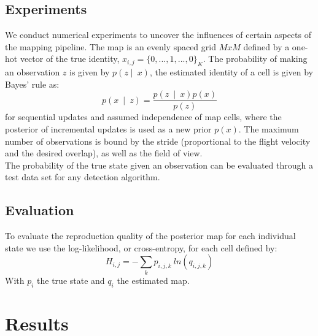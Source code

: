 \documentclass[twocolumn,letterpaper]{IEEEAerospaceCLS}  %
\begin{document}
\subsection{Experiments}
We conduct numerical experiments to uncover the influences of certain aspects of the mapping pipeline. The map is an evenly spaced grid $MxM$ defined by a one-hot vector of the true identity, $x_{i,j} = \{0,..., 1, ..., 0\}_K$. The probability of making an observation $z$ is given by $p(z\mid~x)$, the estimated identity of a cell is given by Bayes' rule as:
\begin{equation}
    p(x~\mid~z) = \frac{p(z~\mid~x) p(x)}{p(z)}
\end{equation} for sequential updates and assumed independence of map cells, where the posterior of incremental updates is used as a new prior $p(x)$. The maximum number of observations is bound by the stride (proportional to the flight velocity and the desired overlap), as well as the field of view.\\
The probability of the true state given an observation can be evaluated through a test data set for any detection algorithm.
\subsection{Evaluation}\label{subsec:MetEval}
To evaluate the reproduction quality of the posterior map for each individual state we use the log-likelihood, or cross-entropy, for each cell defined by:
\begin{equation}
    H_{i,j} = - \sum_{k} p_{i,j,k}~ln(q_{i,j,k})
\end{equation}
With $p_i$ the true state and $q_i$ the estimated map. 
\section{Results} \label{sec:Results}
\end{document}
